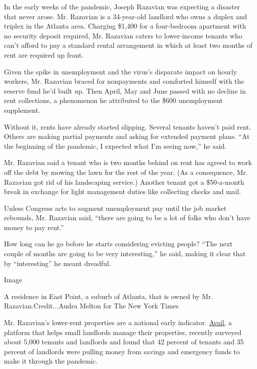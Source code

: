 In the early weeks of the pandemic, Joseph Razavian was expecting a
disaster that never arose. Mr. Razavian is a 34-year-old landlord who
owns a duplex and triplex in the Atlanta area. Charging \$1,400 for a
four-bedroom apartment with no security deposit required, Mr. Razavian
caters to lower-income tenants who can't afford to pay a standard rental
arrangement in which at least two months of rent are required up front.

Given the spike in unemployment and the virus's disparate impact on
hourly workers, Mr. Razavian braced for nonpayments and comforted
himself with the reserve fund he'd built up. Then April, May and June
passed with no decline in rent collections, a phenomenon he attributed
to the \$600 unemployment supplement.

Without it, rents have already started slipping. Several tenants haven't
paid rent. Others are making partial payments and asking for extended
payment plans. ``At the beginning of the pandemic, I expected what I'm
seeing now,'' he said.

Mr. Razavian said a tenant who is two months behind on rent has agreed
to work off the debt by mowing the lawn for the rest of the year. (As a
consequence, Mr. Razavian got rid of his landscaping service.) Another
tenant got a \$50-a-month break in exchange for light management duties
like collecting checks and mail.

Unless Congress acts to augment unemployment pay until the job market
rebounds, Mr. Razavian said, ``there are going to be a lot of folks who
don't have money to pay rent.''

How long can he go before he starts considering evicting people? ``The
next couple of months are going to be very interesting,'' he said,
making it clear that by ``interesting'' he meant dreadful.

Image

A residence in East Point, a suburb of Atlanta, that is owned by Mr.
Razavian.Credit...Audra Melton for The New York Times

Mr. Razavian's lower-rent properties are a national early indicator.
\href{https://www.avail.co/blog/landlords-and-renters-struggling-to-make-ends-meet-during-covid-19-uncertainty}{Avail,}
a platform that helps small landlords manage their properties, recently
surveyed about 5,000 tenants and landlords and found that 42 percent of
tenants and 35 percent of landlords were pulling money from savings and
emergency funds to make it through the pandemic.

